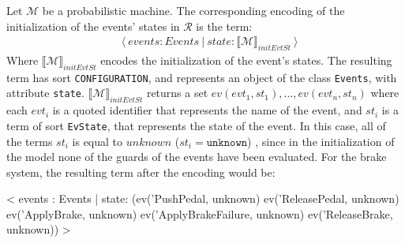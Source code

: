 Let $\mathscr{M}$ be a probabilistic machine. The corresponding encoding of the initialization of the events' states in $\mathscr{R}$ is the term:
    \begin{align*}
    & \langle \ events : Events \ | \ state :  \llbracket \mathscr{M} \rrbracket_{initEvtSt}  \ \rangle
    \end{align*}
Where $\llbracket \mathscr{M} \rrbracket_{initEvtSt}$ encodes the initialization of the event's states. The resulting term has sort \texttt{CONFIGURATION}, and represents an object of the class \texttt{Events}, with attribute \texttt{state}. $\llbracket \mathscr{M} \rrbracket_{initEvtSt}$ returns a set $ev(evt_1,st_1), ..., ev(evt_n,st_n)$ where each $evt_i$ is a quoted identifier that represents the name of the event, and $st_i$ is a term of sort \texttt{EvState}, that represents the state of the event. In this case, all of the terms $st_i$ is equal to $unknown$ ($st_i = \texttt{unknown}$) , since in the initialization of the model none of the guards of the events have been evaluated. For the brake system, the resulting term after the encoding would be:
\begin{maude}

< events : Events | state: (ev('PushPedal, unknown) 
                            ev('ReleasePedal, unknown) 
                            ev('ApplyBrake, unknown) 
                            ev('ApplyBrakeFailure, unknown) 
                            ev('ReleaseBrake, unknown)) >
\end{maude}


